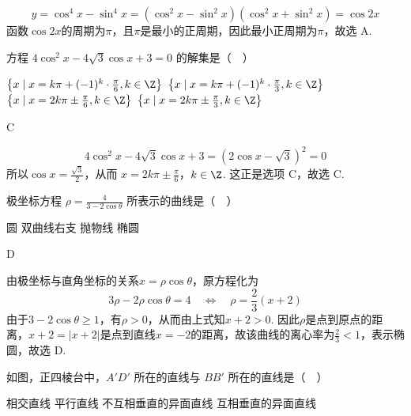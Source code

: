 \begin{solution}
\[
y=\cos^4x-\sin^4x
=(\cos^2x-\sin^2x)(\cos^2x+\sin^2x)
=\cos 2x
\]
函数\(\cos 2x\)的周期为\(\pi\)，且\(\pi\)是最小的正周期，因此最小正周期为\(\pi\)，故选 A.
\end{solution}

\begin{problem}

方程 \(4\cos^2 x - 4\sqrt{3}\cos x + 3 = 0\) 的解集是（\(\quad\)）

\choices
    {\(\left\{x\mid x = k\pi +(-1)^k\cdot \frac{\pi}{6},k\in \Z\right\}\)}
    {\(\left\{x\mid x = k\pi +(-1)^k\cdot \frac{\pi}{3},k\in \Z\right\}\)}
    {\(\left\{x\mid x = 2k\pi \pm \frac{\pi}{6},k\in \Z\right\}\)}
    {\(\left\{x\mid x = 2k\pi \pm \frac{\pi}{3},k\in \Z\right\}\)}
\end{problem}

\begin{answer}
C
\end{answer}

\begin{solution}
\[
4\cos^2x-4\sqrt{3}\cos x+3
=(2\cos x-\sqrt{3})^2=0
\]
所以\(\cos x=\frac{\sqrt{3}}{2}\)，从而
\(x=2k\pi\pm\frac{\pi}{6}\)，\(k\in\Z\).
这正是选项 C，故选 C.
\end{solution}

\begin{problem}

极坐标方程 \(\rho = \frac{4}{3 - 2\cos\theta}\) 所表示的曲线是（\(\quad\)）

\choices
    {圆}
    {双曲线右支}
    {抛物线}
    {椭圆}
\end{problem}

\begin{answer}
D
\end{answer}

\begin{solution}
由极坐标与直角坐标的关系\(x=\rho\cos\theta\)，原方程化为
\[
3\rho-2\rho\cos\theta=4
\quad\Longleftrightarrow\quad
\rho=\frac{2}{3}(x+2)
\]
由于\(3-2\cos\theta\ge1\)，有\(\rho>0\)，从而由上式知\(x+2>0\). 因此\(\rho\)是点到原点的距离，\(x+2=\lvert x+2\rvert\)是点到直线\(x=-2\)的距离，故该曲线的离心率为\(\frac{2}{3}<1\)，表示椭圆，故选 D.
\end{solution}

\begin{problem}

如图，正四棱台中，\(A'D'\) 所在的直线与 \(BB'\) 所在的直线是（\(\quad\)）


\choices
    {相交直线}
    {平行直线}
    {不互相垂直的异面直线}
    {互相垂直的异面直线}
\end{problem}

